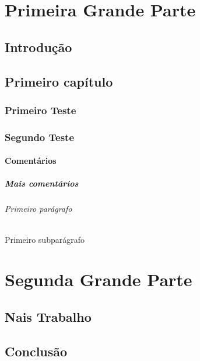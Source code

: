 \documentclass[12pt, a4paper, openany]{book}
\begin{document}
\renewcommand{\contentsname}{Indice}
\tableofcontents
	
\part{Primeira Grande Parte}

\chapter*{Introdução}

\chapter{Primeiro capítulo}

\section{Primeiro Teste}

\lipsum[1]

\section{Segundo Teste}

\subsection{Comentários}

\lipsum[2]

\subsubsection{Mais comentários}

\lipsum[2]

\paragraph{Primeiro parágrafo}

\lipsum[3]

\subparagraph{Primeiro subparágrafo}

\lipsum[3]

\part{Segunda Grande Parte}

\chapter{Nais Trabalho}

\lipsum

\appendix

\chapter{Conclusão}

\lipsum
\end{document}
